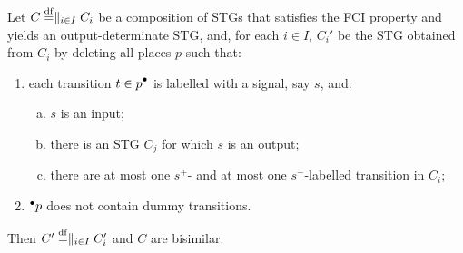 \begin{proposition}\label{pr-main}
Let $C\stackrel{\mathrm{df}}{=}\parallel_{i\in I}C_{i}$ be a composition of STGs
that satisfies the FCI property and yields an
output-determinate STG, and, for each $i\in I$, $C_{i}'$ be the
STG obtained from $C_{i}$ by deleting all places $p$ such that:
\begin{enumerate}[1.]
\item each transition $t\in\post{p}$ is labelled with a
    signal, say $s$, and:
\begin{enumerate}[a)]
\item\label{only-inputs-in-postset} $s$ is an input;
\item\label{exists-matching-output} there is an STG $C_j$ for which $s$ is an output;
\item\label{injective-labelling} there are at most one
    $s^+$- and at most one $s^-$-la\-bel\-led
    transition in $C_i$;
\end{enumerate}
\item\label{no-dummies-in-preset} ${}^\bullet {p}$ does not
    contain dummy transitions.
\end{enumerate}
Then $C'\stackrel{\mathrm{df}}{=}\parallel_{i\in I}C_i'$ and $C$ are bisimilar.
\end{proposition}
